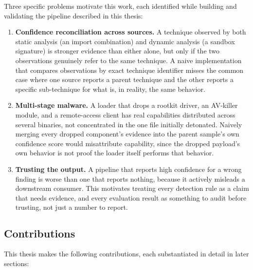 Three specific problems motivate this work, each identified while
building and validating the pipeline described in this thesis:

\begin{enumerate}
  \item \textbf{Confidence reconciliation across sources.} A technique
    observed by both static analysis (an import combination) and
    dynamic analysis (a sandbox signature) is stronger evidence than
    either alone, but only if the two observations genuinely refer to
    the same technique. A naive implementation that compares
    observations by exact technique identifier misses the common case
    where one source reports a parent technique and the other reports
    a specific sub-technique for what is, in reality, the same
    behavior.
  \item \textbf{Multi-stage malware.} A loader that drops a rootkit
    driver, an AV-killer module, and a remote-access client has real
    capabilities distributed across several binaries, not concentrated
    in the one file initially detonated. Naively merging every dropped
    component's evidence into the parent sample's own confidence score
    would misattribute capability, since the dropped payload's own
    behavior is not proof the loader itself performs that behavior.
  \item \textbf{Trusting the output.} A pipeline that reports high
    confidence for a wrong finding is worse than one that reports
    nothing, because it actively misleads a downstream consumer. This
    motivates treating every detection rule as a claim that needs
    evidence, and every evaluation result as something to audit before
    trusting, not just a number to report.
\end{enumerate}

\subsection{Contributions}

This thesis makes the following contributions, each substantiated in
detail in later sections:

